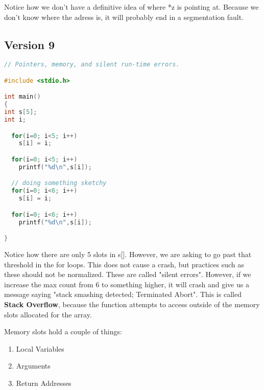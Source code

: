 \documentclass{article}
\begin{document}
Notice how we don't have a definitive idea of where *z is pointing at. Because we don't know where the adress is, it will probably end in a segmentation fault.

\subsection*{Version 9}

\begin{lstlisting}[language=C]
// Pointers, memory, and silent run-time errors.

#include <stdio.h>

int main()
{
int s[5];
int i;

  for(i=0; i<5; i++)
	s[i] = i;

  for(i=0; i<5; i++)
  	printf("%d\n",s[i]);

  // doing something sketchy
  for(i=0; i<6; i++)
	s[i] = i;

  for(i=0; i<6; i++)
	printf("%d\n",s[i]);

}
\end{lstlisting}

Notice how there are only 5 slots in s[]. However, we are asking to go past that threshold in the for loops. This does not cause a crash, but practices such as these should not be normalized. These are called "silent errors".
However, if we increase the max count from 6 to something higher, it will crash and give us a message saying "stack smashing detected; Terminated Abort".
This is called \textbf{Stack Overflow}, because the function attempts to access outside of the memory slots allocated for the array.

Memory slots hold a couple of things:
\begin{enumerate}
    \item Local Variables
    \item Arguments
    \item Return Addresses
\end{enumerate}
\end{document}
